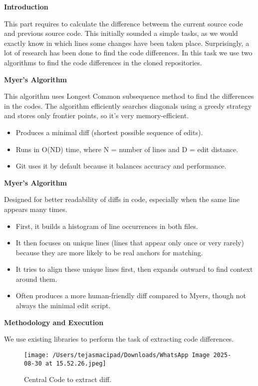 \documentclass[12pt, a4paper]{report}
\newcommand{\sectionbar}[1]{%
  \vspace{0.6\baselineskip}%
  \noindent
  \colorbox{sectionbar}{%
    \parbox{\dimexpr\linewidth-2\fboxsep\relax}{%
      \textbf{\Large\textsf{#1}}%
    }%
  }%
  \vspace{0.6\baselineskip}
}
\begin{document}
\sectionbar{Introduction}

This part requires to calculate the difference betweem the current source code and previous source code. This initially sounded a simple tasks, as we would exactly know in which lines some changes have been taken place.
Surprisingly, a lot of research has been done to find the code differences. In this task we use two algorithms to find the code differences in the cloned repositories.

\textbf{Myer's Algorithm}

This algorithm uses Longest Common subsequence method to find the differences in the codes. The algorithm efficiently searches diagonals using a greedy strategy and stores only frontier points, so it’s very memory-efficient.

\begin{itemize}
    \item Produces a minimal diff (shortest possible sequence of edits).
    \item Runs in O(ND) time, where N = number of lines and D = edit distance.
    \item Git uses it by default because it balances accuracy and performance.
\end{itemize}

\textbf{Myer's Algorithm}

Designed for better readability of diffs in code, especially when the same line appears many times.

\begin{itemize}
    \item First, it builds a histogram of line occurrences in both files.
    \item It then focuses on unique lines (lines that appear only once or very rarely) because they are more likely to be real anchors for matching.
    \item It tries to align these unique lines first, then expands outward to find context around them.
    \item Often produces a more human-friendly diff compared to Myers, though not always the minimal edit script.
\end{itemize}

\sectionbar{Methodology and Execution}

We use existing libraries to perform the task of extracting code differences.

\begin{figure}[h!]
    \centering
    \texttt{[image: /Users/tejasmacipad/Downloads/WhatsApp Image 2025-08-30 at 15.52.26.jpeg]}
    \caption{Central Code to extract diff.}
    \label{fig:image for diff}
\end{figure}
\end{document}
